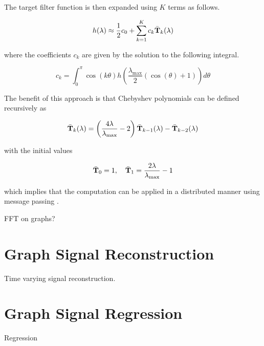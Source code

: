 The target filter function is then expanded using $K$ terms as follows. 

\begin{equation}
    h(\lambda) \approx \frac{1}{2} c_0 + \sum_{k=1}^K c_k \bar{\mathbf{T}}_k(\lambda)
\end{equation}

where the coefficients $c_k$ are given by the solution to the following integral. 

\begin{equation}
    c_k = \int_{0}^{\pi} \cos(k \theta) h\left(\frac{\lambda_{\text{max}}}{2} (\cos(\theta) + 1)\right) d\theta
\end{equation}

The benefit of this approach is that Chebyshev polynomials can be defined recursively as 

\begin{equation}
    \bar{\mathbf{T}}_k(\lambda) = \left(\frac{4 \lambda }{\lambda_{\text{max}}}  - 2\right) \bar{\mathbf{T}}_{k-1}(\lambda) - \bar{\mathbf{T}}_{k-2}(\lambda)
\end{equation}

with the initial values

\begin{equation}
    \bar{\mathbf{T}}_0 = 1, \quad \bar{\mathbf{T}}_1 = \frac{2 \lambda }{\lambda_{\text{max}}} - 1
\end{equation}

which implies that the computation can be applied in a distributed manner using message passing \citep{Shuman2018}. 



FFT on graphs? \cite{LeMagoarou2016}

\cite{Kondor2002}

\cite{Smola2003}

\cite{Zhu2003}



\section{Graph Signal Reconstruction}


\cite{Qiu2017} Time varying signal reconstruction. 



\section{Graph Signal Regression}

\cite{Guestrin2004} Regression

